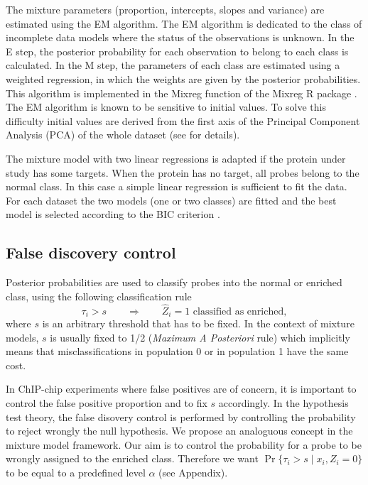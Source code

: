 \documentclass{llncs}
\begin{document}
The mixture parameters (proportion, intercepts, slopes and variance)
are estimated using the EM algorithm. The EM algorithm is dedicated
to the class of incomplete data models where the status of the
observations is unknown. In the E step, the posterior probability
for each observation to belong to each class is calculated. In the M
step, the parameters of each class are estimated using a weighted
regression, in which the weights are given by the posterior
probabilities. This algorithm is implemented in the Mixreg function
of the Mixreg R package \cite{Turner00}.
\\ The EM algorithm is known to be sensitive to initial values. To solve this difficulty initial
values are derived from the first axis of the Principal Component
Analysis (PCA) of the whole dataset (see \cite{Berard07} for
details).


The mixture model with two linear regressions is adapted if the
protein under study has some targets. When the protein has no
target, all probes belong to the normal class. In this case a simple
linear regression is sufficient to fit the data. For each dataset
the two models  (one or two classes) are fitted and the best model
is selected according to the BIC criterion \cite{Schwarz78}.

\subsection{False discovery control}  \label{fdc}
Posterior probabilities are used to classify probes into the normal
or enriched class, using the following classification rule
$$
{\tau}_{i} > s \qquad \Rightarrow \qquad \widehat{Z}_i=1 \text{ classified as enriched},
$$
where $s$ is an arbitrary  threshold that has to be fixed. In the
context of mixture models, $s$ is usually fixed to 1/2 ({\it Maximum
A Posteriori} rule) which implicitly means that misclassifications
in population 0 or in population 1 have the same cost.

In ChIP-chip experiments where false positives are of concern, it is
important to control the false positive proportion and to fix $s$
accordingly. In the hypothesis test theory, the false disovery
control is performed by controlling the probability to reject
wrongly the null hypothesis. We propose an analoguous concept in the
mixture model framework. Our aim is to control the probability for a
probe to be wrongly assigned to the enriched class. Therefore we
want $\Pr\{\tau_{i} > s \;|\; x_i, Z_i =0\}$ to be equal to a
predefined level $\alpha$ (see Appendix).
\end{document}
